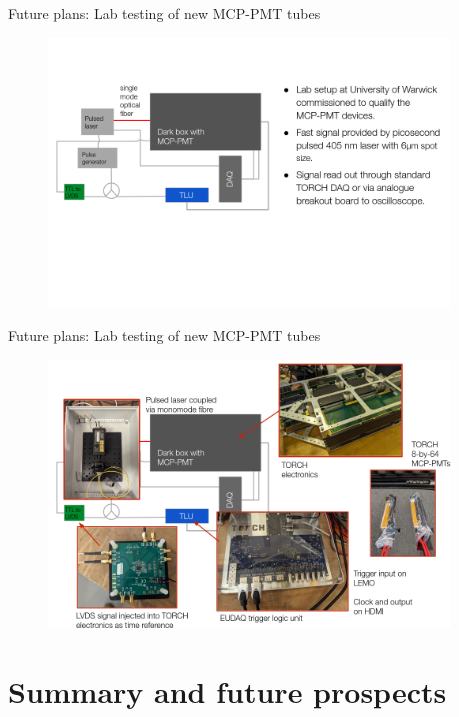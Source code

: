 \documentclass[xcolor={dvipsnames}]{beamer}
\begin{document}
\begin{frame}{Future plans: Lab testing of new MCP-PMT tubes}
  \begin{figure}
    \centering
    \includegraphics[width = 0.95\textwidth]{Figs/WarwickLabSetup.png}
  \end{figure}
\end{frame}

\begin{frame}{Future plans: Lab testing of new MCP-PMT tubes}
  \begin{figure}
    \centering
    \includegraphics[width = 0.95\textwidth]{Figs/WarwickLabSetupPhotos.png}
  \end{figure}
\end{frame}

\section{Summary and future prospects}
\end{document}
